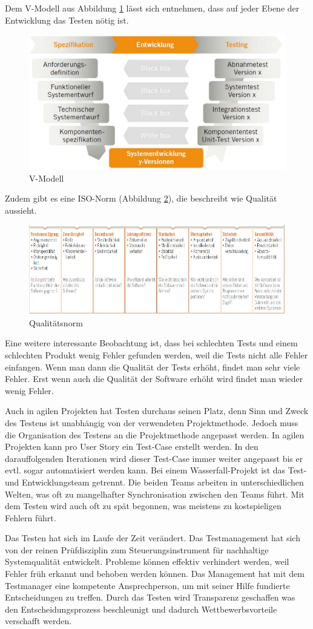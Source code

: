 Dem V-Modell aus Abbildung \ref{fig:v-modell} lässt sich entnehmen, dass auf jeder Ebene der Entwicklung das Testen nötig ist.
\begin{figure}
\centering
\includegraphics[width=0.7\linewidth]{fig/v-modell}
\caption{V-Modell}
\label{fig:v-modell}
\end{figure}
Zudem gibt es eine ISO-Norm (Abbildung \ref{fig:iso-25000}), die beschreibt wie Qualität aussieht.
\begin{figure}
\centering
\includegraphics[width=0.5\linewidth]{fig/iso-25000}
\caption{Qualitätsnorm}
\label{fig:iso-25000}
\end{figure}
Eine weitere interessante Beobachtung ist, dass bei schlechten Tests und einem schlechten Produkt wenig Fehler gefunden werden, weil die Tests nicht alle Fehler einfangen. Wenn man dann die Qualität der Tests erhöht, findet man sehr viele Fehler. Erst wenn auch die Qualität der Software erhöht wird findet man wieder wenig Fehler.

Auch in agilen Projekten hat Testen durchaus seinen Platz, denn Sinn und Zweck des Testens ist unabhängig von der verwendeten Projektmethode. Jedoch muss die Organisation des Testens an die Projektmethode angepasst werden. In agilen Projekten kann pro User Story ein Test-Case erstellt werden. In den darauffolgenden Iterationen wird dieser Test-Case immer weiter angepasst bis er evtl. sogar automatisiert werden kann. Bei einem Wasserfall-Projekt ist das Test- und Entwicklungsteam getrennt. Die beiden Teams arbeiten in unterschiedlichen Welten, was oft zu mangelhafter Synchronisation zwischen den Teams führt. Mit dem Testen wird auch oft zu spät begonnen, was meistens zu kostspieligen Fehlern führt. 

Das Testen hat sich im Laufe der Zeit verändert. Das Testmanagement hat sich von der reinen Prüfdisziplin zum Steuerungsinstrument für nachhaltige Systemqualität entwickelt. Probleme können effektiv verhindert werden, weil Fehler früh erkannt und behoben werden können. Das Management hat mit dem Testmanager eine kompetente Ansprechperson, um mit seiner Hilfe fundierte Entscheidungen zu treffen. Durch das Testen wird Transparenz geschaffen was den Entscheidungsprozess beschleunigt und dadurch Wettbewerbsvorteile verschafft werden.

